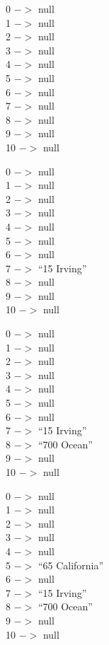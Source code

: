 \documentclass[10pt]{article}
\begin{document}
\begin{enumerate}
			\vspace{0.5cm}
			0 $->$ null\\
			1 $->$ null\\
			2 $->$ null\\
			3 $->$ null\\
			4 $->$ null\\
			5 $->$ null\\
			6 $->$ null\\
			7 $->$ null\\
			8 $->$ null\\
			9 $->$ null\\
			10 $->$ null
			
			\vspace{0.5cm}
			0 $->$ null\\
			1 $->$ null\\
			2 $->$ null\\
			3 $->$ null\\
			4 $->$ null\\
			5 $->$ null\\
			6 $->$ null\\
			7 $->$ ``15 Irving''\\
			8 $->$ null\\
			9 $->$ null\\
			10 $->$ null
			
			\vspace{0.5cm}
			0 $->$ null\\
			1 $->$ null\\
			2 $->$ null\\
			3 $->$ null\\
			4 $->$ null\\
			5 $->$ null\\
			6 $->$ null\\
			7 $->$ ``15 Irving''\\
			8 $->$ ``700 Ocean''\\
			9 $->$ null\\
			10 $->$ null
			
			\vspace{0.5cm}
			0 $->$ null\\
			1 $->$ null\\
			2 $->$ null\\
			3 $->$ null\\
			4 $->$ null\\
			5 $->$ ``65 California''\\
			6 $->$ null\\
			7 $->$ ``15 Irving''\\
			8 $->$ ``700 Ocean''\\
			9 $->$ null\\
			10 $->$ null
			

\end{enumerate}
\end{document}
